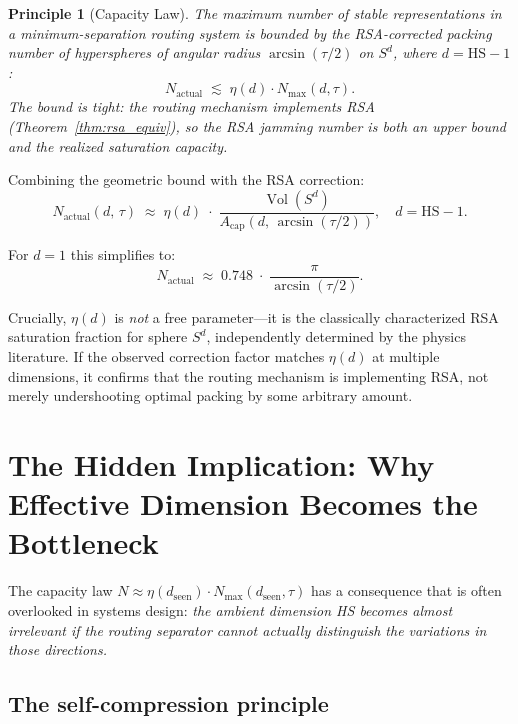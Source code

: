 \documentclass[11pt]{article}
\newtheorem{principle}[theorem]{Principle}
\begin{document}
\begin{principle}[Capacity Law]\label{law:capacity}
The maximum number of stable representations in a minimum-separation routing system is bounded by the RSA-corrected packing number of hyperspheres of angular radius $\arcsin(\tau/2)$ on $S^d$, where $d = \mathrm{HS}-1$:
\[
  N_{\mathrm{actual}} \;\lesssim\; \eta(d) \cdot N_{\max}(d, \tau).
\]
The bound is tight: the routing mechanism implements RSA (Theorem~\ref{thm:rsa_equiv}), so the RSA jamming number is both an upper bound and the realized saturation capacity.
\end{principle}

Combining the geometric bound with the RSA correction:
\[
  \boxed{
    N_{\mathrm{actual}}(d,\,\tau)
    \;\approx\;
    \eta(d)
    \;\cdot\;
    \frac{\operatorname{Vol}(S^d)}{A_{\mathrm{cap}}(d,\,\arcsin(\tau/2))},
    \quad d = \mathrm{HS} - 1.
  }
  \tag{Capacity Law}
\]

For $d=1$ this simplifies to:
\[
  N_{\mathrm{actual}}
  \;\approx\;
  0.748 \;\cdot\;
  \frac{\pi}{\arcsin(\tau/2)}.
\]

Crucially, $\eta(d)$ is \emph{not} a free parameter---it is the classically
characterized RSA saturation fraction for sphere $S^d$, independently
determined by the physics literature.
If the observed correction factor matches $\eta(d)$ at multiple dimensions,
it confirms that the routing mechanism is implementing RSA, not merely
undershooting optimal packing by some arbitrary amount.

\section{The Hidden Implication: Why Effective Dimension Becomes the Bottleneck}
\label{sec:implication}

The capacity law $N \approx \eta(d_{\text{seen}}) \cdot N_{\max}(d_{\text{seen}}, \tau)$ has a consequence
that is often overlooked in systems design: \emph{the ambient dimension HS becomes almost irrelevant
if the routing separator cannot actually distinguish the variations in those directions.}

\subsection{The self-compression principle}
\end{document}
